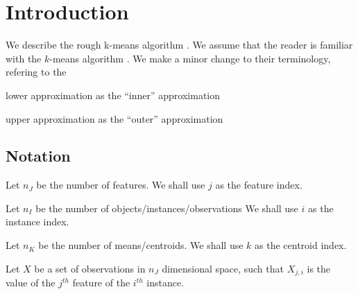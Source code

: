 
\section{Introduction}

We describe the rough k-means algorithm \cite{Peters2012}. 
We assume that the reader is familiar with the \(k\)-means algorithm
\cite{Hastie2009}. We make a minor change to their terminology, 
refering to the 
\bi
\item lower approximation as the ``inner'' approximation
\item upper approximation as the ``outer'' approximation
\ei

\subsection{Notation}

\be
\item Let \(n_J\) be the number of features. 
We shall use \(j\) as the feature index. 
\item Let \(n_I\) be the number of objects/instances/observations
We shall use \(i\) as the instance index. 
\item Let \(n_K\) be the number of means/centroids.
We shall use \(k\) as the centroid index. 
\item Let \(X\) be a set of observations in \(n_J\) dimensional space, 
such that \(X_{j, i}\) is the value of the \(j^{th}\) feature of 
the \(i^{th}\) instance. 

